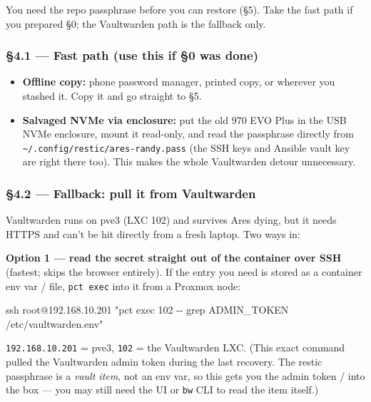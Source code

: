 \documentclass[
]{article}
\newenvironment{Shaded}{\begin{snugshade}}{\end{snugshade}}
\newcommand{\FunctionTok}[1]{\textcolor[rgb]{0.00,0.00,0.00}{#1}}
\newcommand{\NormalTok}[1]{#1}
\newcommand{\StringTok}[1]{\textcolor[rgb]{0.31,0.60,0.02}{#1}}
\providecommand{\tightlist}{%
  \setlength{\itemsep}{0pt}\setlength{\parskip}{0pt}}
\begin{document}
You need the repo passphrase before you can restore (§5). Take the fast
path if you prepared §0; the Vaultwarden path is the fallback only.

\hypertarget{fast-path-use-this-if-0-was-done}{%
\subsubsection{§4.1 --- Fast path (use this if §0 was
done)}\label{fast-path-use-this-if-0-was-done}}

\begin{itemize}
\tightlist
\item
  \textbf{Offline copy:} phone password manager, printed copy, or
  wherever you stashed it. Copy it and go straight to §5.
\item
  \textbf{Salvaged NVMe via enclosure:} put the old 970 EVO Plus in the
  USB NVMe enclosure, mount it read-only, and read the passphrase
  directly from
  \texttt{\textasciitilde{}/.config/restic/ares-randy.pass} (the SSH
  keys and Ansible vault key are right there too). This makes the whole
  Vaultwarden detour unnecessary.
\end{itemize}

\hypertarget{fallback-pull-it-from-vaultwarden}{%
\subsubsection{§4.2 --- Fallback: pull it from
Vaultwarden}\label{fallback-pull-it-from-vaultwarden}}

Vaultwarden runs on pve3 (LXC 102) and survives Ares dying, but it needs
HTTPS and can't be hit directly from a fresh laptop. Two ways in:

\textbf{Option 1 --- read the secret straight out of the container over
SSH} (fastest; skips the browser entirely). If the entry you need is
stored as a container env var / file, \texttt{pct\ exec} into it from a
Proxmox node:

\begin{Shaded}
\begin{Highlighting}[]
\FunctionTok{ssh}\NormalTok{ root@192.168.10.201 }\StringTok{"pct exec 102 {-}{-} grep ADMIN\_TOKEN /etc/vaultwarden.env"}
\end{Highlighting}
\end{Shaded}

\texttt{192.168.10.201} = pve3, \texttt{102} = the Vaultwarden LXC.
(This exact command pulled the Vaultwarden admin token during the last
recovery. The restic passphrase is a \emph{vault item}, not an env var,
so this gets you the admin token / into the box --- you may still need
the UI or \texttt{bw} CLI to read the item itself.)
\end{document}
